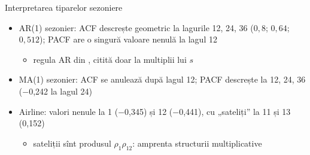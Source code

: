 \begin{frame}{Interpretarea tiparelor sezoniere}
\itemsize{\small}
\begin{itemize}
    \item AR(1) sezonier: ACF descrește geometric la lagurile 12, 24, 36 ($0{,}8$; $0{,}64$; $0{,}512$); PACF are o singură valoare nenulă la lagul 12
    \begin{itemize}
        \item regula AR din , citită doar la multiplii lui $s$
    \end{itemize}
    \item MA(1) sezonier: ACF se anulează după lagul 12; PACF descrește la 12, 24, 36 (\ensuremath{-}0{,}242 la lagul 24)
    \item Airline: valori nenule la 1 (\ensuremath{-}0{,}345) și 12 (\ensuremath{-}0{,}441), cu „sateliți” la 11 și 13 (0{,}152)
    \begin{itemize}
        \item sateliții sînt produsul $\rho_1\rho_{12}$: amprenta structurii multiplicative
    \end{itemize}
\end{itemize}
\end{frame}

